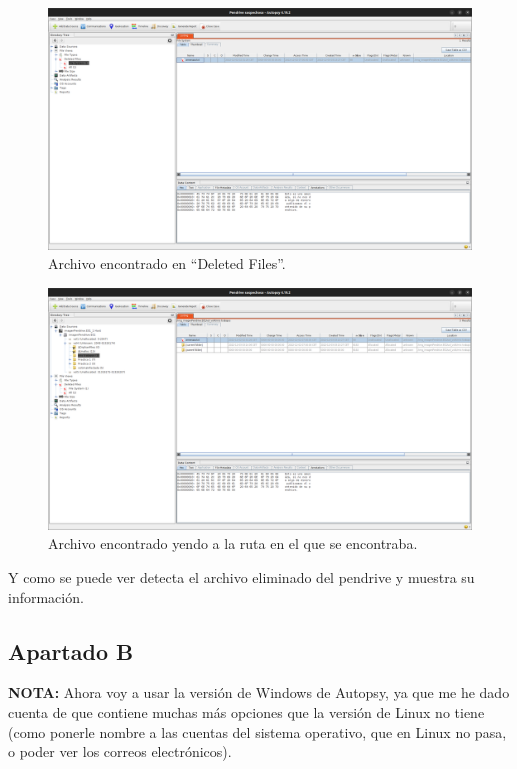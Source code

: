 \documentclass{article}
\begin{document}
\begin{figure}[H]
    \centering
    \includegraphics[width=\textwidth]{imagenes/Captura desde 2022-12-03 21-52-53.png}
    \caption{Archivo encontrado en ``Deleted Files''.}
\end{figure}

\begin{figure}[H]
    \centering
    \includegraphics[width=\textwidth]{imagenes/Captura desde 2022-12-03 21-53-51.png}
    \caption{Archivo encontrado yendo a la ruta en el que se encontraba.}
\end{figure}

Y como se puede ver detecta el archivo eliminado del pendrive y muestra su información.

\newpage

\subsection{Apartado B}

\textbf{NOTA: }Ahora voy a usar la versión de Windows de Autopsy, ya que me he dado cuenta de que contiene muchas más opciones que la versión de Linux no tiene (como ponerle nombre a las cuentas del sistema operativo, que en Linux no pasa, o poder ver los correos electrónicos).
\end{document}
